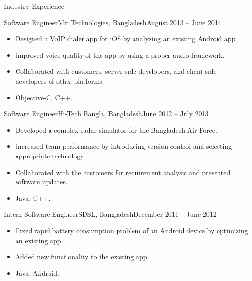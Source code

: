 \documentclass[]{mcdowellcv}
\begin{document}
    \begin{cvsection}{Industry Experience}
                
        \begin{cvsubsection}{Software Engineer}{Mir Technologies, Bangladesh}{August 2013 -- June 2014}
            \begin{itemize}
                \item Designed a VoIP dialer app for iOS by analyzing an existing Android app.
                \item Improved voice quality of the app by using a proper audio framework.
                \item Collaborated with customers, server-side developers, and client-side developers of other platforms.
                \item Objective-C, C++.
            \end{itemize}
\end{cvsubsection}        
        \begin{cvsubsection}{Software Engineer}{Hi-Tech Bangla, Bangladesh}{June 2012 -- July 2013}    
   
            \begin{itemize}
                \item Developed a complex radar simulator for the Bangladesh Air Force.
                \item Increased team performance by introducing version control and selecting appropriate technology.
                \item Collaborated with the customers for requirement analysis and presented software updates.
                \item Java, C++.
            \end{itemize}        
        \end{cvsubsection}
        
        \begin{cvsubsection}{Intern Software Engineer}{SDSL, Bangladesh}{December 2011 -- June 2012}    
            \begin{itemize}
                \item Fixed rapid battery consumption problem of an Android device by optimizing an existing app. 
                \item Added new functionality to the existing app.
                \item Java, Android.
            \end{itemize}
        \end{cvsubsection}        
    \end{cvsection}
    
\end{document}
